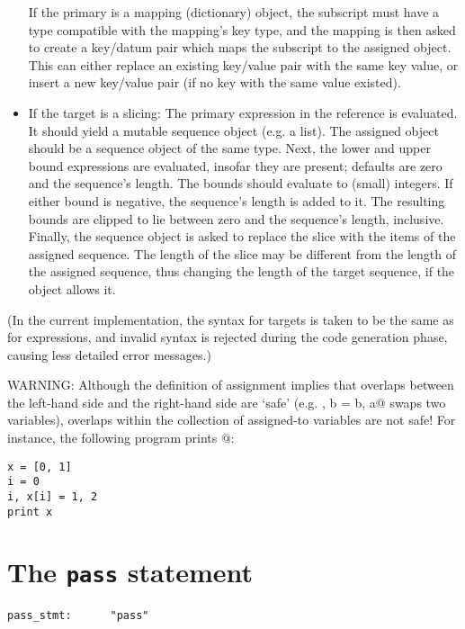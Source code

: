 \begin{itemize}
If the primary is a mapping (dictionary) object, the subscript must
have a type compatible with the mapping's key type, and the mapping is
then asked to create a key/datum pair which maps the subscript to
the assigned object.  This can either replace an existing key/value
pair with the same key value, or insert a new key/value pair (if no
key with the same value existed).

\item
If the target is a slicing: The primary expression in the reference is
evaluated.  It should yield a mutable sequence object (e.g. a list).  The
assigned object should be a sequence object of the same type.  Next,
the lower and upper bound expressions are evaluated, insofar they are
present; defaults are zero and the sequence's length.  The bounds
should evaluate to (small) integers.  If either bound is negative, the
sequence's length is added to it.  The resulting bounds are clipped to
lie between zero and the sequence's length, inclusive.  Finally, the
sequence object is asked to replace the slice with the items of the
assigned sequence.  The length of the slice may be different from the
length of the assigned sequence, thus changing the length of the
target sequence, if the object allows it.

\end{itemize}
	
(In the current implementation, the syntax for targets is taken
to be the same as for expressions, and invalid syntax is rejected
during the code generation phase, causing less detailed error
messages.)

WARNING: Although the definition of assignment implies that overlaps
between the left-hand side and the right-hand side are `safe' (e.g.
\verb@a, b = b, a@ swaps two variables), overlaps within the
collection of assigned-to variables are not safe!  For instance, the
following program prints \code@[0, 2]@:

\begin{verbatim}
x = [0, 1]
i = 0
i, x[i] = 1, 2
print x
\end{verbatim}


\section{The {\tt pass} statement}

\begin{verbatim}
pass_stmt:      "pass"
\end{verbatim}

